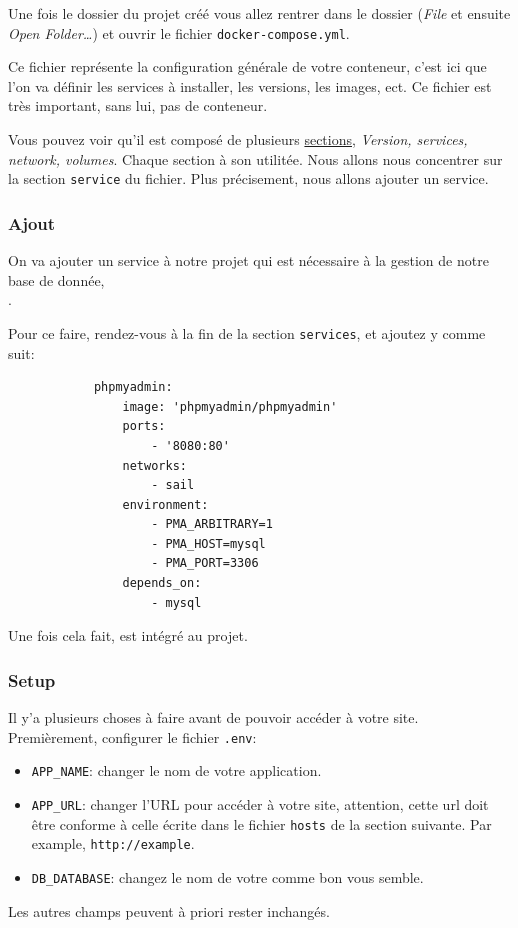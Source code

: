         Une fois le dossier du projet créé vous allez rentrer dans le dossier (\textit{File} et ensuite \textit{Open Folder\ldots}) et ouvrir le fichier \verb|docker-compose.yml|.

        Ce fichier représente la configuration générale de votre conteneur, c'est ici que l'on va définir les services à installer, les versions, les images, ect.
        Ce fichier est très important, sans lui, pas de conteneur.

        Vous pouvez voir qu'il est composé de plusieurs \href{https://docs.docker.com/compose/compose-file/}{sections}, \textit{Version, services, network, volumes}. Chaque section à son utilitée. Nous allons nous concentrer sur la section \verb|service| du fichier. Plus précisement, nous allons ajouter un service.\\ 


    \subsubsection[Ajout PhpMyAdmin]{Ajout \phpmyadmin{}}

        On va ajouter un service à notre projet qui est nécessaire à la gestion de notre base de donnée,\\ \phpmyadmin{}.
        
        Pour ce faire, rendez-vous à la fin de la section \verb|services|, et ajoutez y \phpmyadmin{} comme suit:

        \begin{lstlisting}
            phpmyadmin:
                image: 'phpmyadmin/phpmyadmin'
                ports:
                    - '8080:80'
                networks:
                    - sail
                environment:
                    - PMA_ARBITRARY=1
                    - PMA_HOST=mysql
                    - PMA_PORT=3306
                depends_on:
                    - mysql
        \end{lstlisting}

        Une fois cela fait, \phpmyadmin{} est intégré au projet.

        \subsubsection{Setup}
        Il y'a plusieurs choses à faire avant de pouvoir accéder à votre site. Premièrement, configurer le fichier \verb|.env|:

        \begin{itemize}
            \item \verb|APP_NAME|: changer le nom de votre application.
            \item \verb|APP_URL|: changer l'URL pour accéder à votre site, attention, cette url doit être conforme à celle écrite dans le fichier \verb|hosts| de la section suivante. Par example, \verb|http://example|.
            \item \verb|DB_DATABASE|: changez le nom de votre \db{} comme bon vous semble.
        \end{itemize}
        Les autres champs peuvent à priori rester inchangés.

